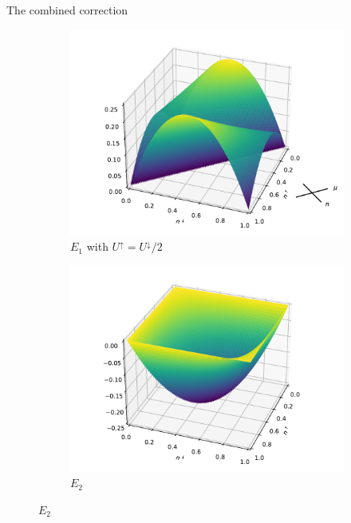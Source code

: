 \documentclass[xcolor=table,aspectratio=169]{beamer}
\numberwithin{equation}{section}
\begin{document}
\begin{frame}{The combined correction}
    \begin{figure}
        \centering
        \begin{subfigure}[b]{0.4\columnwidth}
            \includegraphics[width=\columnwidth]{figures/novel_u_correction.pdf}
            \caption{$E_1$ with $U^\uparrow = U^\downarrow/2$}
        \end{subfigure}
        \begin{subfigure}[b]{0.4\columnwidth}
            \includegraphics[width=\columnwidth]{figures/novel_k_correction.pdf}
            \caption{$E_2$}
        \end{subfigure}
    \end{figure}

\end{frame}
\end{document}
